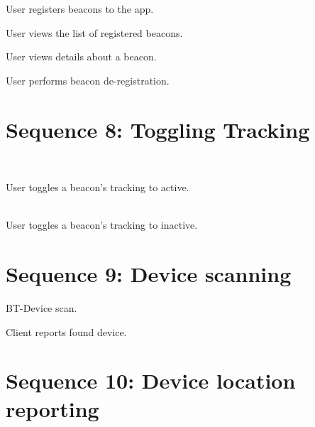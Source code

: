 User registers \glspl{beacon} to the app.
\\[12pt]
\resizebox{\linewidth}{!}{}

User views the list of registered \glspl{beacon}.
\\[12pt]
\resizebox{\linewidth}{!}{}

User views details about a \gls{beacon}.
\\[12pt]
\resizebox{\linewidth}{!}{}

User performs \gls{beacon} de-registration.


\section{Sequence 8: Toggling Tracking}

\resizebox{\linewidth}{!}{}
\\[12pt]

\resizebox{\linewidth}{!}{}

User toggles a \gls{beacon}'s tracking to active.
\\[12pt]

\resizebox{\linewidth}{!}{}
\\[12pt]

\resizebox{\linewidth}{!}{}

User toggles a \gls{beacon}'s tracking to inactive.

\section{Sequence 9: Device scanning}
\resizebox{\linewidth}{!}{}

BT-Device scan.
\\[12pt]

\resizebox{\linewidth}{!}{}

Client reports found device.


\section{Sequence 10: Device location reporting}
\resizebox{\linewidth}{!}{}
\\[12pt]

